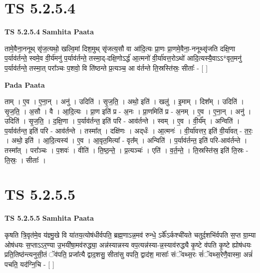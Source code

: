 \documentclass[17pt]{extarticle}
\begin{document}
\section*{ TS 5.2.5.4 }

\textbf{TS 5.2.5.4 } \newline
\textbf{Samhita Paata} \newline

तामे॒वैना॒ननूथ् सृ॑ज॒त्यथो॒ खल्वि॒मां दिश॒मुथ् सृ॑जत्य॒सौ वा आ॑दि॒त्यः प्रा॒णः प्रा॒णमे॒वैना॒-ननूथ्सृ॑जति दक्षि॒णा प॒र्याव॑र्तन्ते॒ स्वमे॒व वी॒र्य॑मनु॑ प॒र्याव॑र्तन्ते॒ तस्मा॒द्-दक्षि॒णोऽर्द्ध॑ आ॒त्मनो॑ वी॒र्या॑वत्त॒रोऽथो॑ आदि॒त्यस्यै॒वाऽऽ*वृत॒मनु॑ प॒र्याव॑र्तन्ते॒ तस्मा॒त् परा᳚ञ्चः प॒शवो॒ वि ति॑ष्ठन्ते प्र॒त्यञ्च॒ आ व॑र्तन्ते ति॒स्रस्ति॑स्रः॒ सीताः᳚ - [  ] \newline

\textbf{Pada Paata} \newline

ताम् । ए॒व । ए॒ना॒न् । अनु॑ । उदिति॑ । सृ॒ज॒ति॒ । अथो॒ इति॑ । खलु॑ । इ॒माम् । दिश᳚म् । उदिति॑ । सृ॒ज॒ति॒ । अ॒सौ । वै । आ॒दि॒त्यः । प्रा॒ण इति॑ प्र - अ॒नः । प्रा॒णमिति॑ प्र - अ॒नम् । ए॒व । ए॒ना॒न् । अनु॑ । उदिति॑ । सृ॒ज॒ति॒ । द॒क्षि॒णा । प॒र्याव॑र्तन्त॒ इति॑ परि - आव॑र्तन्ते । स्वम् । ए॒व । वी॒र्य᳚म् । अन्विति॑ । प॒र्याव॑र्तन्त॒ इति॑ परि - आव॑र्तन्ते । तस्मा᳚त् । दक्षि॑णः । अद्‌र्धः॑ । आ॒त्मनः॑ । वी॒र्या॑वत्तर॒ इति॑ वी॒र्या॑वत् - त॒रः॒ । अथो॒ इति॑ । आ॒दि॒त्यस्य॑ । ए॒व । आ॒वृत॒मित्या᳚ - वृत᳚म् । अन्विति॑ । प॒र्याव॑र्तन्त॒ इति॑ परि-आव॑र्तन्ते । तस्मा᳚त् । परा᳚ञ्चः । प॒शवः॑ । वीति॑ । ति॒ष्ठ॒न्ते॒ । प्र॒त्यञ्चः॑ । एति॑ । व॒र्त॒न्ते॒ । ति॒स्रस्ति॑स्र॒ इति॑ ति॒स्रः - ति॒स्रः॒ । सीताः᳚ ।  \newline




\section*{ TS 5.2.5.5 }

\textbf{TS 5.2.5.5 } \newline
\textbf{Samhita Paata} \newline

कृषति त्रि॒वृत॑मे॒व य॑ज्ञ्मु॒खे वि या॑तय॒त्योष॑धीर्वपति॒ ब्रह्म॒णाऽन्न॒मव॑ रुन्धे॒ ऽर्के᳚ऽर्कश्ची॑यते चतुर्द॒शभि॑र्वपति स॒प्त ग्रा॒म्या ओष॑धयः स॒प्ताऽऽर॒ण्या उ॒भयी॑षा॒मव॑रुद्ध्या॒ अन्न॑स्यान्नस्य वप॒त्यन्न॑स्या-न्न॒स्याव॑रुद्ध्यै कृ॒ष्टे व॑पति कृ॒ष्टे ह्योष॑धयः प्रति॒तिष्ठ॑न्त्यनुसी॒तं ॅव॑पति॒ प्रजा᳚त्यै द्वाद॒शसु॒ सीता॑सु वपति॒ द्वाद॑श॒ मासाः᳚ संॅवथ्स॒रः सं॑ॅवथ्स॒रेणै॒वास्मा॒ अन्नं॑ पचति॒ यद॑ग्नि॒चि - [  ] \newline
\end{document}
